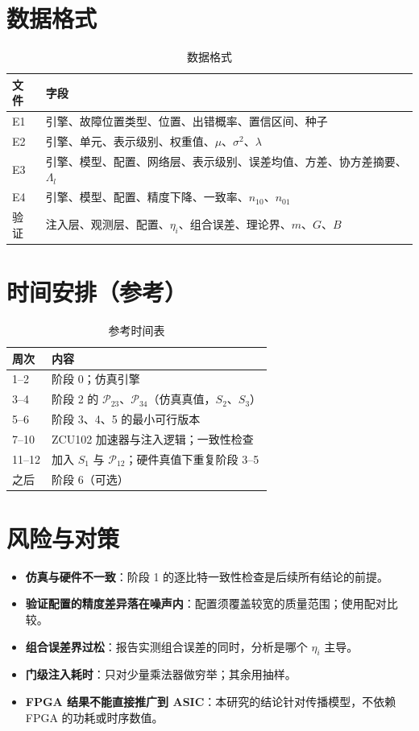 \documentclass[11pt,a4paper]{ctexart}
\begin{document}
\section{数据格式}
\begin{table}[h]
\centering
\small
\begin{tabularx}{\textwidth}{@{}lX@{}}
\toprule
文件 & 字段 \\
\midrule
E1 & 引擎、故障位置类型、位置、出错概率、置信区间、种子 \\
E2 & 引擎、单元、表示级别、权重值、$\mu$、$\sigma^2$、$\lambda$ \\
E3 & 引擎、模型、配置、网络层、表示级别、误差均值、方差、协方差摘要、$\Lambda_l$ \\
E4 & 引擎、模型、配置、精度下降、一致率、$n_{10}$、$n_{01}$ \\
验证 & 注入层、观测层、配置、$\eta_i$、组合误差、理论界、$m$、$G$、$B$ \\
\bottomrule
\end{tabularx}
\caption{数据格式}
\end{table}

\section{时间安排（参考）}
\begin{table}[h]
\centering
\small
\begin{tabular}{@{}ll@{}}
\toprule
周次 & 内容 \\
\midrule
1--2 & 阶段 0；仿真引擎 \\
3--4 & 阶段 2 的 $\mathcal P_{23}$、$\mathcal P_{34}$（仿真真值，$S_2$、$S_3$） \\
5--6 & 阶段 3、4、5 的最小可行版本 \\
7--10 & ZCU102 加速器与注入逻辑；一致性检查 \\
11--12 & 加入 $S_1$ 与 $\mathcal P_{12}$；硬件真值下重复阶段 3--5 \\
之后 & 阶段 6（可选） \\
\bottomrule
\end{tabular}
\caption{参考时间表}
\end{table}

\section{风险与对策}
\begin{itemize}[leftmargin=*]
  \item \textbf{仿真与硬件不一致}：阶段 1 的逐比特一致性检查是后续所有结论的前提。
  \item \textbf{验证配置的精度差异落在噪声内}：配置须覆盖较宽的质量范围；使用配对比较。
  \item \textbf{组合误差界过松}：报告实测组合误差的同时，分析是哪个 $\eta_i$ 主导。
  \item \textbf{门级注入耗时}：只对少量乘法器做穷举；其余用抽样。
  \item \textbf{FPGA 结果不能直接推广到 ASIC}：本研究的结论针对传播模型，不依赖 FPGA 的功耗或时序数值。
\end{itemize}
\end{document}
